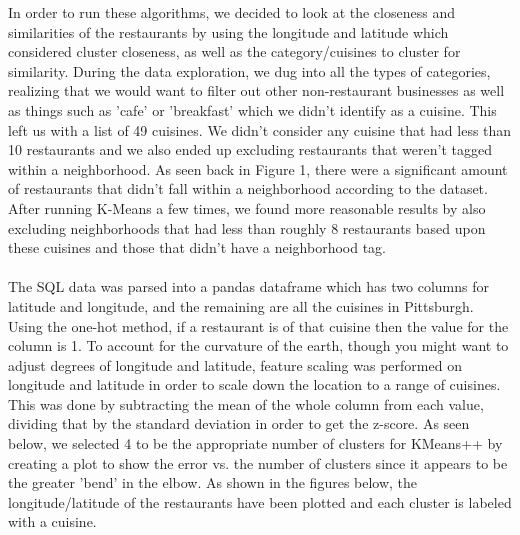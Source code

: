 \documentclass{neu_handout}
\begin{document}
\begin{figure}[h]
\centering
{}
\end{figure}

In order to run these algorithms, we decided to look at the closeness and similarities of the restaurants by using the longitude and latitude which considered cluster closeness, as well as the category/cuisines to cluster for similarity. During the data exploration, we dug into all the types of categories, realizing that we would want to filter out other non-restaurant businesses as well as things such as 'cafe' or 'breakfast' which we didn't identify as a cuisine. This left us with a list of 49 cuisines. We didn't consider any cuisine that had less than 10 restaurants and we also ended up excluding restaurants that weren't tagged within a neighborhood. As seen back in Figure 1, there were a significant amount of restaurants that didn't fall within a neighborhood according to the dataset. After running K-Means a few times, we found more reasonable results by also excluding neighborhoods that had less than roughly 8 restaurants based upon these cuisines and those that didn't have a neighborhood tag.
\\\\
The SQL data was parsed into a pandas dataframe which has two columns for latitude and longitude, and the remaining are all the cuisines in Pittsburgh. Using the one-hot method, if a restaurant is of that cuisine then the value for the column is 1. To account for the curvature of the earth, though you might want to adjust degrees of longitude and latitude, feature scaling was performed on longitude and latitude in order to scale down the location to a range of cuisines. This was done by subtracting the mean of the whole column from each value, dividing that by the standard deviation in order to get the z-score. As seen below, we selected 4 to be the appropriate number of clusters for KMeans++ by creating a plot to show the error vs. the number of clusters since it appears to be the greater 'bend' in the elbow. As shown in the figures below, the longitude/latitude of the restaurants have been plotted and each cluster is labeled with a cuisine.
\end{document}
